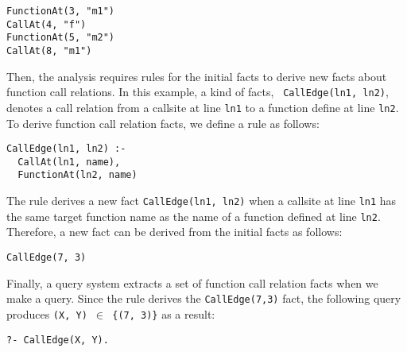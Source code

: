 \begin{lstlisting}
FunctionAt(3, "m1")
CallAt(4, "f")
FunctionAt(5, "m2")
CallAt(8, "m1")
\end{lstlisting}

Then, the analysis requires rules for the initial facts to derive new facts
about function call relations. In this example, a kind of facts, {\tt
CallEdge(ln1, ln2)}, denotes a call relation from a callsite at line {\tt ln1}
to a function define at line {\tt ln2}. To derive function call relation facts,
we define a rule as follows: 


\begin{lstlisting}
CallEdge(ln1, ln2) :-
  CallAt(ln1, name),
  FunctionAt(ln2, name)
\end{lstlisting}


\noindent
The rule derives a new fact {\tt CallEdge(ln1, ln2)} when a callsite at line
{\tt ln1} has the same target function name as the name of a function defined
at line {\tt ln2}. Therefore, a new fact can be derived from the initial facts
as follows: 

\begin{lstlisting}
CallEdge(7, 3)
\end{lstlisting}

Finally, a query system extracts a set of function call relation facts when we
make a query. Since the rule derives the {\tt CallEdge(7,3)} fact, the
following query produces {\tt (X, Y) $\in$ \{(7, 3)\}} as a result:


\begin{lstlisting}
?- CallEdge(X, Y).
\end{lstlisting}


